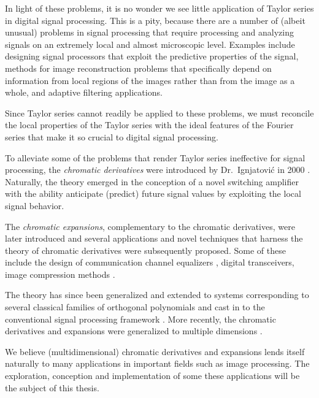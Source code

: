\documentclass[11pt,oneside]{book}
\theoremstyle{plain}
\theoremstyle{definition}
\theoremstyle{remark}
\begin{document}
In light of these problems, it is no wonder we see little application of Taylor series
in digital signal processing. This is a pity, because there are a number of (albeit unusual) 
problems in signal processing that require processing and analyzing signals on an extremely
local and almost microscopic level. Examples include designing signal processors that exploit 
the predictive properties of the signal, methods for image reconstruction problems that 
specifically depend on information from local regions of the images rather than from the 
image as a whole, and adaptive filtering applications.

Since Taylor series cannot readily be applied to these problems, we must reconcile 
the local properties of the Taylor series with the ideal features of the Fourier 
series that make it so crucial to digital signal processing.

To alleviate some of the problems that render Taylor series ineffective for signal processing, 
the \emph{chromatic derivatives} were introduced by Dr.~Ignjatovi\'{c} in 2000 \cite{ignjatovic2000signal}. 
Naturally, the
theory emerged in the conception of a novel switching amplifier with the ability anticipate
(predict) future signal values by exploiting the local signal behavior.

The \emph{chromatic expansions}, complementary to the chromatic derivatives, were later introduced \cite{ignjatovic2001method} 
and several applications and novel techniques that harness the theory of chromatic derivatives
were subsequently proposed. Some of these include the design of communication channel
equalizers \cite{herron2001towards}, digital transceivers, image compression methods \cite{cushman2001method}.

The theory has since been generalized and extended to systems corresponding to several classical 
families of orthogonal polynomials \cite{Cushman2001,Herron2001} and cast in to the conventional 
signal processing framework \cite{Vaidyanathan2001,Narasimha2002}. 
More recently, the chromatic derivatives and expansions were generalized to 
multiple dimensions \cite{Ignjatovic2011a}.

We believe (multidimensional) chromatic derivatives and expansions lends itself naturally
to many applications in important fields such as image processing. The exploration, 
conception and implementation of some these applications will be the subject of this thesis. 
\end{document}
